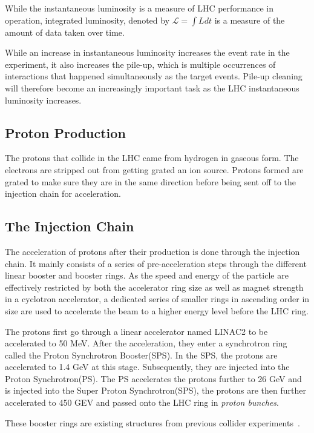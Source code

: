 While the instantaneous luminosity is a measure of LHC performance in operation, integrated luminosity, denoted by $\mathcal{L} = \int L dt$ is a measure of the amount of data taken over time.

While an increase in instantaneous luminosity increases the event rate in the experiment, it also increases the pile-up, which is multiple occurrences of interactions that happened simultaneously as the target events. Pile-up cleaning will therefore become an increasingly important task as the LHC instantaneous luminosity increases.

\subsection{Proton Production}
The protons that collide in the LHC came from hydrogen in gaseous form. The electrons are stripped out from getting grated an ion source. Protons formed are grated to make sure they are in the same direction before being sent off to the injection chain for acceleration. 

\subsection{The Injection Chain}
The acceleration of protons after their production is done through the injection chain. It mainly consists of a series of pre-acceleration steps through the different linear booster and booster rings. As the speed and energy of the particle are effectively restricted by both the accelerator ring size as well as magnet strength in a cyclotron accelerator, a dedicated series of smaller rings in ascending order in size are used to accelerate the beam to a higher energy level before the LHC ring.

The protons first go through a linear accelerator named LINAC2 to be accelerated to 50 MeV. After the acceleration, they enter a synchrotron ring called the Proton Synchrotron Booster(SPS). In the SPS, the protons are accelerated to 1.4 GeV at this stage. Subsequently, they are injected into the Proton Synchrotron(PS). The PS accelerates the protons further to 26 GeV and is injected into the Super Proton Synchrotron(SPS), the protons are then further accelerated to 450 GEV and passed onto the LHC ring in \textit{proton bunches}.

These booster rings are existing structures from previous collider experiments~\cite{ATLAS:1999vwa}.

